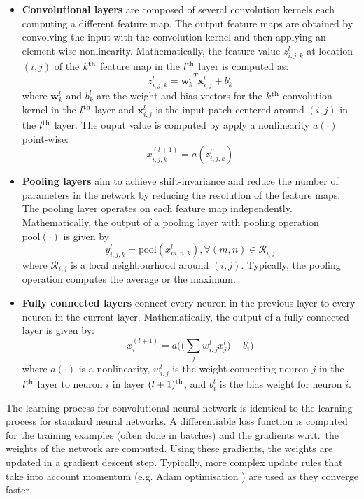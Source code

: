 \documentclass{article}
\begin{document}
\begin{itemize}
	\item \textbf{Convolutional layers} are composed of  several 	convolution kernels each computing a different feature map. The output feature maps are obtained by convolving the input with the convolution kernel and then applying an element-wise nonlinearity. Mathematically, the feature value $z_{i,j,k}^l$ at location $(i,j)$ of the $k\textsuperscript{th}$ feature map in the $l\textsuperscript{th}$ layer is computed as:
	\[z_{i,j,k}^l = {\mathbf{w}_k^l}^T \mathbf{x}_{i,j}^l + b_k^l\]
	where  $\mathbf{w}_k^l$ and $b_k^l$ are the weight and bias vectors for the $k\textsuperscript{th}$ convolution kernel in the $l\textsuperscript{th}$ layer and $\mathbf{x}_{i,j}^l$ is the input patch centered around $(i,j)$ in the $l\textsuperscript{th}$ layer. The ouput value is computed by apply a nonlinearity $a(\cdot)$ point-wise:
	\[x_{i,j,k}^{(l+1)} = a(z_{i,j,k}^l) \]

	\item \textbf{Pooling layers} aim to achieve shift-invariance and reduce the number of parameters in the network by reducing the resolution of the feature maps. The pooling layer operates on each feature map independently. Mathematically, the output of a pooling layer with pooling operation $\textrm{pool}(\cdot)$ is given by 
	\[ y_{i,j,k}^l = \textrm{pool}(x^l_{m,n,k}), \forall (m,n) \in \mathcal{R}_{i,j}\]
	where $\mathcal{R}_{i,j}$ is a local neighbourhood around $(i,j)$. Typically, the pooling operation computes the average or the maximum.
	
	\item \textbf{Fully connected layers} connect every neuron in the previous layer to every neuron in the current layer. Mathematically, the output of a fully connected layer is given by:
	\[ x^{(l+1)}_i = a\Big(\big( \sum_j w_{i,j}^l x^l_j \big) + b^l_i\big)\]
	where $a(\cdot)$ is a nonlinearity, $w_{i,j}^l$ is the weight connecting neuron $j$ in the $l\textsuperscript{th}$ layer to neuron $i$ in layer $(l+1)\textsuperscript{th}$, and $b_i^l$ is the bias weight for neuron $i$.
\end{itemize}
The learning process for convolutional neural network is identical to the learning process for standard neural networks. A differentiable loss function is computed for the training examples (often done in batches) and the gradients w.r.t.\ the weights of the network are computed. Using these gradients, the weights are updated in a gradient descent step. Typically, more complex update rules that take into account momentum (e.g. Adam optimisation \cite{adam}) are used as they converge faster. 
\end{document}
